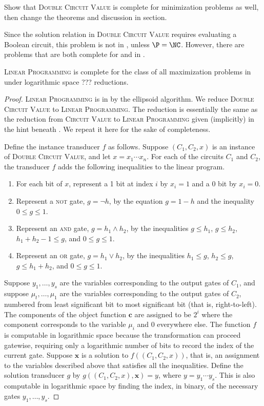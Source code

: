 \documentclass[]{article}
\begin{document}
\begin{todo}
  Show that \textsc{Double Circuit Value} is complete for minimization problems as well, then change the theorems and discussion in section.
\end{todo}

Since the solution relation in \textsc{Double Circuit Value} requires evaluating a Boolean circuit, this problem is not in \NNCO{}, unless $\P = \NC$.
However, there are problems that are both complete for \PO{} and in \NNCO.

\begin{theorem}
  \textsc{Linear Programming} is complete for the class of all maximization problems in \PO{} under logarithmic space ??? reductions.
\end{theorem}
\begin{proof}
  \textsc{Linear Programming} is in \PO{} by the ellipsoid algorithm.
  We reduce \textsc{Double Circuit Value} to \textsc{Linear Programming}.
  The reduction is essentially the same as the reduction from \textsc{Circuit Value} to \textsc{Linear Programming} given (implicitly) in the hint beneath \cite[Problem~A.4.1]{ghr95}.
  We repeat it here for the sake of completeness.

  Define the instance transducer $f$ as follows.
  Suppose $(C_1, C_2, x)$ is an instance of \textsc{Double Circuit Value}, and let $x = x_1 \dotsb x_n$.
  For each of the circuits $C_1$ and $C_2$, the transducer $f$ adds the following inequalities to the linear program.
  \begin{enumerate}
  \item For each bit of $x$, represent a 1 bit at index $i$ by $x_i = 1$ and a 0 bit by $x_i = 0$.
  \item Represent a \textsc{not} gate, $g = \lnot h$, by the equation $g = 1 - h$ and the inequality $0 \leq g \leq 1$.
  \item Represent an \textsc{and} gate, $g = h_1 \land h_2$, by the inequalities $g \leq h_1$, $g \leq h_2$, $h_1 + h_2 - 1 \leq g$, and $0 \leq g \leq 1$.
  \item Represent an \textsc{or} gate, $g = h_1 \lor h_2$, by the inequalities $h_1 \leq g$, $h_2 \leq g$, $g \leq h_1 + h_2$, and $0 \leq g \leq 1$.
  \end{enumerate}
  Suppose $y_1, \dotsc, y_s$ are the variables corresponding to the output gates of $C_1$, and suppose $\mu_t, \dotsc, \mu_1$ are the variables corresponding to the output gates of $C_2$, numbered from least significant bit to most significant bit (that is, right-to-left).
  The components of the object function $\mathbf{c}$ are assigned to be $2^i$ where the component corresponds to the variable $\mu_i$ and 0 everywhere else.
  The function $f$ is computable in logarithmic space because the transformation can proceed gatewise, requiring only a logarithmic number of bits to record the index of the current gate.
  Suppose $\mathbf{x}$ is a solution to $f((C_1, C_2, x))$, that is, an assignment to the variables described above that satisfies all the inequalities.
  Define the solution transducer $g$ by $g((C_1, C_2, x), \mathbf{x}) = y$, where $y = y_1 \dotsb y_s$.
  This is also computable in logarithmic space by finding the index, in binary, of the necessary gates $y_1, \dotsc, y_s$.


\end{proof}
\end{document}
